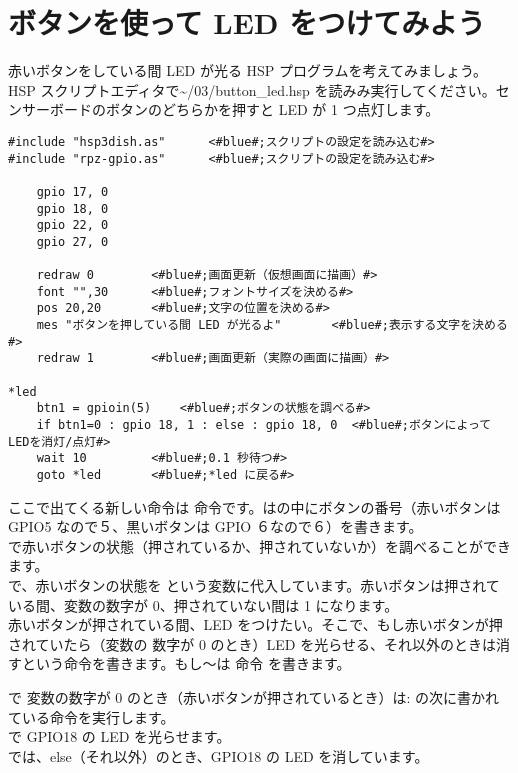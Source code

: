 \section{ボタンを使って LED をつけてみよう}
赤いボタンをしている間 LED が光る HSP プログラムを考えてみましょう。HSP スクリプトエディタで\textasciitilde /03/button\_led.hsp を読みみ実行してください。センサーボードのボタンのどちらかを押すと LED が 1 つ点灯します。\\

\begin{lstlisting}[caption=\textasciitilde/03/button\_led.hsp,label=button_led.hsp]
#include "hsp3dish.as"		<#blue#;スクリプトの設定を読み込む#>
#include "rpz-gpio.as"		<#blue#;スクリプトの設定を読み込む#>

	gpio 17, 0
	gpio 18, 0
	gpio 22, 0
	gpio 27, 0
   
	redraw 0		<#blue#;画面更新（仮想画面に描画）#>
	font "",30		<#blue#;フォントサイズを決める#>
	pos 20,20		<#blue#;文字の位置を決める#>
	mes "ボタンを押している間 LED が光るよ"		<#blue#;表示する文字を決める#>
	redraw 1		<#blue#;画面更新（実際の画面に描画）#>

*led
	btn1 = gpioin(5) 	<#blue#;ボタンの状態を調べる#>
	if btn1=0 : gpio 18, 1 : else : gpio 18, 0 	<#blue#;ボタンによってLEDを消灯/点灯#>
	wait 10 		<#blue#;0.1 秒待つ#>
	goto *led 		<#blue#;*led に戻る#>
\end{lstlisting}

ここで出てくる新しい命令は  命令です。は\code{()}の中にボタンの番号（赤いボタンは
GPIO5 なので５、黒いボタンは GPIO ６なので６）を書きます。\\

で赤いボタンの状態（押されているか、押されていないか）を調べることができます。\\
で、赤いボタンの状態を  という変数に代入しています。赤いボタンは押されている間、変数の数字が 0、押されていない間は 1 になります。\\

赤いボタンが押されている間、LED をつけたい。そこで、もし赤いボタンが押されていたら（変数の
数字が 0 のとき）LED を光らせる、それ以外のときは消すという命令を書きます。もし～は  命令
を書きます。

 で  変数の数字が 0 のとき（赤いボタンが押されているとき）は\code{ }: の次に書かれている命令を実行します。\\
 で GPIO18 の LED を光らせます。\\
 では、else（それ以外）のとき、GPIO18 の LED を消しています。\\


